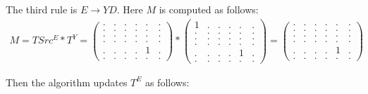 The third rule is $E \to Y D$.
Here $M$ is computed as follows:
{
    \renewcommand{\arraystretch}{0.7}
    \setlength\arraycolsep{2pt}
\begin{align*}
M = TSrc^E * T^Y =
\begin{pmatrix}
    . & . & . & . & . & . \\
    . & . & . & . & . & . \\
    . & . & . & . & . & . \\
    . & . & . & . & . & . \\
    . & . & . & . & 1 & . \\
    . & . & . & . & . & .
\end{pmatrix}*
\begin{pmatrix}
    1 & . & . & . & . & . \\
    . & . & . & . & . & . \\
    . & . & . & . & . & . \\
    . & . & . & . & . & . \\
    . & . & . & . & 1 & . \\
    . & . & . & . & . & .
\end{pmatrix}=
\begin{pmatrix}
    . & . & . & . & . & . \\
    . & . & . & . & . & . \\
    . & . & . & . & . & . \\
    . & . & . & . & . & . \\
    . & . & . & . & 1 & . \\
    . & . & . & . & . & .
\end{pmatrix}
\end{align*}
}

Then the algorithm updates $T^E$ as follows:

